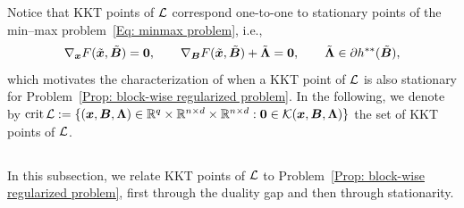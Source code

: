Notice that KKT points of $\mathcal{L}$ correspond one-to-one to stationary points of the min--max problem~\eqref{Eq: minmax problem}, i.e.,
\begin{equation}\label{Eq: saddle-KKT-convexified}
\nabla_{\bx}F(\tilde{\bx},\tilde{\bB})=\bm{0},
\qquad
\nabla_{\bB}F(\tilde{\bx},\tilde{\bB})+\tilde{\bLmbd}=\bm{0},
\qquad
\tilde{\bLmbd}\in\partial h^{**}(\tilde{\bB}),
\end{equation}which motivates the characterization of when a KKT point of $\mathcal{L}$ is also stationary for Problem~\eqref{Prop: block-wise regularized problem}. In the following, we denote by $\operatorname{crit}\mathcal{L}:=\{(\bm{x}, \bm{B}, \bm{\Lambda}) \in \mathbb{R}^{q} \times \mathbb{R}^{n\times d} \times \mathbb{R}^{n\times d}: \bm{0} \in \mathcal K(\bm{x}, \bm{B}, \bm{\Lambda})\}$ the set of KKT points of $\mathcal{L}$.
\endgroup

\subsection{}
\label{Sec: original optimality relations}
\begingroup\color{blue}
In this subsection, we relate KKT points of $\mathcal{L}$ to Problem~\eqref{Prop: block-wise regularized problem}, first through the duality gap and then through stationarity.

